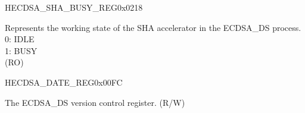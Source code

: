 \begin{register}{H}{ECDSA\_SHA\_BUSY\_REG}{0x0218}\label{regdesc:ECDSASHABUSYREG}
%
%
\regnewline%
\begin{regdesc}\begin{reglist}
\label{fielddesc:ECDSASHABUSY}\item [ECDSA\_SHA\_BUSY] Represents the working state of the SHA accelerator in the ECDSA\_DS process.\\
0: IDLE\\
1: BUSY\\
(RO)
\end{reglist}\end{regdesc}
\end{register}


\begin{register}{H}{ECDSA\_DATE\_REG}{0x00FC}\label{regdesc:ECDSADATEREG}
%
%
\regnewline%
\begin{regdesc}\begin{reglist}
\label{fielddesc:ECDSADATE}\item [ECDSA\_DATE] The ECDSA\_DS version control register. (R/W)
\end{reglist}\end{regdesc}
\end{register}
